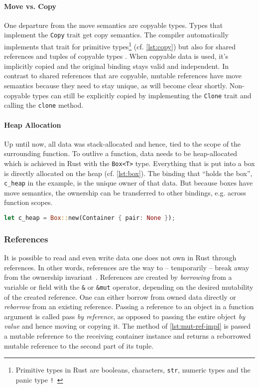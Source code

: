 \paragraph{Move vs. Copy}

One departure from the move semantics are copyable types. Types that implement
the \lstinline!Copy! trait get copy semantics. The compiler automatically
implements that trait for primitive types\footnote{Primitive types in Rust are
booleans, characters, \lstinline!str!, numeric types and the panic type
\texttt{!}~\cite{rustref}} (cf. \autoref{lst:copy}) but also for shared
references and tuples of copyable types \cite[section "Special types and
traits"]{rustref}. When copyable data is used, it's implicitly copied and the
original binding stays valid and independent. In contrast to shared references
that are copyable, mutable references have move semantics because they need to
stay unique, as will become clear shortly. Non-copyable types can still be
explicitly copied by implementing the \lstinline!Clone! trait and calling the
\lstinline!clone! method.

\paragraph{Heap Allocation}

Up until now, all data was stack-allocated and hence, tied to the scope of the
surrounding function. To outlive a function, data needs to be heap-allocated
which is achieved in Rust with the \lstinline!Box<T>! type. Everything that is
put into a box is directly allocated on the heap (cf. \autoref{lst:box}). The
binding that ``holds the box'', \lstinline!c_heap! in the example, is the unique
owner of that data. But because boxes have move semantics, the ownership can be
transferred to other bindings, e.g. across function scopes.

\begin{lstlisting}[language=Rust, label=lst:box, caption={A heap-allocated container.}, style=short]
let c_heap = Box::new(Container { pair: None });
\end{lstlisting}

\subsubsection{References}
\label{references}

It is possible to read and even write data one does not own in Rust through
references. In other words, references are the way to -- temporarily -- break
away from the ownership invariant~\cite{lightweight-formalism}. References are
created by \emph{borrowing} from a variable or field with the \lstinline!&! or
\lstinline!&mut! operator, depending on the desired mutability of the created
reference. One can either borrow from owned data directly or \emph{reborrow}
from an existing reference. Passing a reference to an object in a function
argument is called pass \emph{by reference}, as opposed to passing the entire
object \emph{by value} and hence moving or copying it. The method of
\autoref{lst:mut-ref-impl} is passed a mutable reference to the receiving
container instance and returns a reborrowed mutable reference to the second part
of its tuple.

